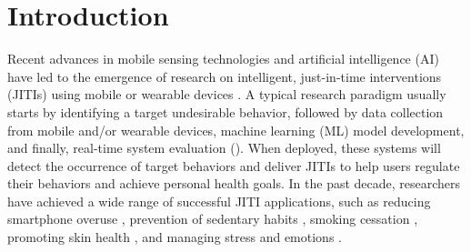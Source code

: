 

\section{Introduction}
\label{sec:introduction}


Recent advances in mobile sensing technologies and artificial intelligence (AI) have led to the emergence of research on intelligent, just-in-time interventions (JITIs)  using mobile or wearable devices \cite{li2024stayfocused, sarker2014assessing, liao2020personalized, rojas2021scalable, alharbi2023smokemon, rabbi2015mybehavior, zhao2023affective}.
A typical research paradigm usually starts by identifying a target undesirable behavior, followed by data collection from mobile and/or wearable devices, machine learning (ML) model development, and finally, real-time system evaluation (\eg \cite{orzikulova2024time2stop, han2022stressbal, lee2017itchtector, kim2022prediction, alharbi2023smokemon}).
When deployed, these systems will detect the occurrence of target behaviors and deliver JITIs to help users regulate their behaviors and achieve personal health goals.
In the past decade, researchers have achieved a wide range of successful JITI applications, such as reducing smartphone overuse \cite{lu2024interactout, xu2022typeout}, prevention of sedentary habits \cite{liao2020personalized}, smoking cessation \cite{alharbi2023smokemon}, promoting skin health \cite{lee2017itchtector, rojas2021scalable}, and managing stress and emotions \cite{kim2022prediction, koch2021drivers}.

